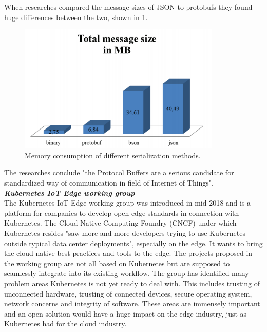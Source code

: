 When researches compared the message sizes of JSON to protobufs they found huge differences between the two, shown in \cref{fig:jsonVsProtobufs}.
\begin{figure}[H]
    \centering
    \includegraphics[scale=0.45]{figures/jsonVsProtobufs.png}
    \caption{Memory consumption of different serialization methods\cite{}.}
    \label{fig:jsonVsProtobufs}
\end{figure}
The researches conclude "the Protocol Buffers are a serious candidate for standardized way of communication in field of Internet of Things"\cite{jsonVsProtobufs}.\\[5mm]
{{\textbf{\textit{Kubernetes IoT Edge working group}}}}\\
The Kubernetes IoT Edge working group\cite{IntroducingDejanBosanac:KubernetesIoTEdgeWorkingGroup} was introduced in mid 2018 and is a platform for companies to develop open edge standards in connection with Kubernetes. The Cloud Native Computing Foundry (CNCF) under which Kubernetes resides "saw more and more developers trying to use Kubernetes outside typical data center deployments"\cite{IntroducingDejanBosanac:KubernetesIoTEdgeWorkingGroup}, especially on the edge. It wants to bring the cloud-native best practices and tools to the edge. The projects proposed in the working group are not all based on Kubernetes but are supposed to seamlessly integrate into its existing workflow. The group has identified many problem areas Kubernetes is not yet ready to deal with. This includes trusting of unconnected hardware, trusting of connected devices, secure operating system, network concerns and integrity of software. These areas are immensely important and an open solution would have a huge impact on the edge industry, just as Kubernetes had for the cloud industry.



